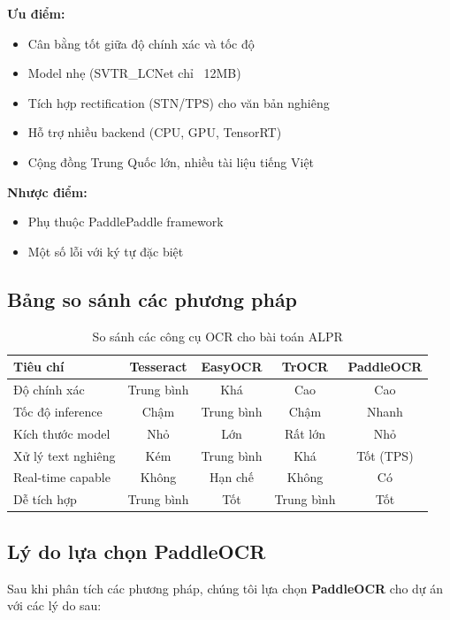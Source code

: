 \textbf{Ưu điểm:}
\begin{itemize}
    \item Cân bằng tốt giữa độ chính xác và tốc độ
    \item Model nhẹ (SVTR\_LCNet chỉ ~12MB)
    \item Tích hợp rectification (STN/TPS) cho văn bản nghiêng
    \item Hỗ trợ nhiều backend (CPU, GPU, TensorRT)
    \item Cộng đồng Trung Quốc lớn, nhiều tài liệu tiếng Việt
\end{itemize}

\textbf{Nhược điểm:}
\begin{itemize}
    \item Phụ thuộc PaddlePaddle framework
    \item Một số lỗi với ký tự đặc biệt
\end{itemize}

\subsection{Bảng so sánh các phương pháp}

\begin{table}[!ht]
\centering
\caption{So sánh các công cụ OCR cho bài toán ALPR}
\label{tab:ocr_comparison}
\begin{tabular}{|l|c|c|c|c|}
\hline
\textbf{Tiêu chí} & \textbf{Tesseract} & \textbf{EasyOCR} & \textbf{TrOCR} & \textbf{PaddleOCR} \\ \hline
Độ chính xác & Trung bình & Khá & Cao & Cao \\ \hline
Tốc độ inference & Chậm & Trung bình & Chậm & Nhanh \\ \hline
Kích thước model & Nhỏ & Lớn & Rất lớn & Nhỏ \\ \hline
Xử lý text nghiêng & Kém & Trung bình & Khá & Tốt (TPS) \\ \hline
Real-time capable & Không & Hạn chế & Không & Có \\ \hline
Dễ tích hợp & Trung bình & Tốt & Trung bình & Tốt \\ \hline
\end{tabular}
\end{table}

\subsection{Lý do lựa chọn PaddleOCR}
Sau khi phân tích các phương pháp, chúng tôi lựa chọn \textbf{PaddleOCR} cho dự án với các lý do sau:

